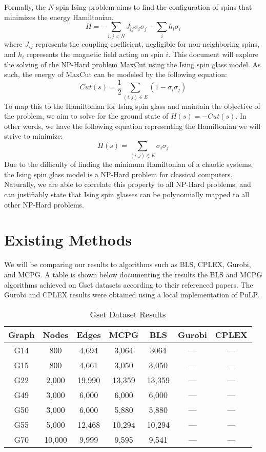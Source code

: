 \documentclass[conference]{IEEEtran}
\begin{document}
Formally, the $N$-spin Ising problem aims to find the configuration of spins that minimizes the energy Hamiltonian, 
\begin{equation}
H = -\sum_{i,j<N}J_{ij}\sigma_i\sigma_j - \sum_ih_i\sigma_i
\end{equation}
where $J_{ij}$ represents the coupling coefficient, negligible for non-neighboring spins, and $h_i$ represents the magnetic field acting on spin $i$. This document will explore the solving of the NP-Hard problem MaxCut using the Ising spin glass model. As such, the energy of MaxCut can be modeled by the following equation:
\begin{equation}
Cut(s) = \frac{1}{2}\sum_{(i,j)\in E}(1-\sigma_i\sigma_j)
\end{equation}
To map this to the Hamiltonian for Ising spin glass and maintain the objective of the problem, we aim to solve for the ground state of $H(s) = -Cut(s)$. In other words, we have the following equation representing the Hamiltonian we will strive to minimize:
\begin{equation}
H(s) = \sum_{(i,j)\in E}\sigma_i\sigma_j
\end{equation}
Due to the difficulty of finding the minimum Hamiltonian of a chaotic systems, the Ising spin glass model is a NP-Hard problem for classical computers. Naturally, we are able to correlate this property to all NP-Hard problems, and can justifiably state that Ising spin glasses can be polynomially mapped to all other NP-Hard problems\cite{b2}.

\section{Existing Methods}
We will be comparing our results to algorithms such as BLS, CPLEX, Gurobi, and MCPG. A table is shown below documenting the results the BLS and MCPG algorithms achieved on Gset datasets according to their referenced papers. The Gurobi and CPLEX results were obtained using a local implementation of PuLP.

\begin{table}[htbp]
\caption{Gset Dataset Results}
\begin{center}
\begin{tabular}{|c|c|c|c|c|c|c|}
\hline
\textbf{Graph} & \textbf{Nodes} & \textbf{Edges} & \textbf{MCPG} & \textbf{BLS} & \textbf{Gurobi} &\textbf{CPLEX}\\
\hline 
G14 & 800& 4,694& 3,064 &3064 & --- &---\\
\hline
G15 & 800& 4,661& 3,050 & 3,050 &---  &---\\
\hline
G22 & 2,000& 19,990& 13,359 &13,359 &--- &---\\
\hline
G49 & 3,000& 6,000& 6,000 &6,000 &--- &---\\
\hline
G50 & 3,000& 6,000& 5,880 &5,880 &--- &---\\
\hline
G55 & 5,000& 12,468& 10,294 &10,294 &--- &---\\
\hline
G70 & 10,000& 9,999 & 9,595 &9,541 &--- &---\\
\hline
\end{tabular}
\label{tab1}
\end{center}
\end{table}
\end{document}
